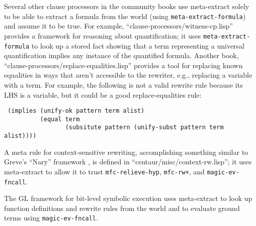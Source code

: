 Several other clause processors in the community books use
meta-extract solely to be able to extract a formula from the world
(using \texttt{meta-extract-formula}) and assume it to be true.  For
example, ``clause-processors/witness-cp.lisp'' provides a framework
for reasoning about quantification; it uses
\texttt{meta-extract-formula} to look up a stored fact showing that a
term representing a universal quantification implies any instance
of the quantified formula.  Another book,
``clause-processors/replace-equalities.lisp'' provides a tool for
replacing known equalities in ways that aren't accessible to the
rewriter, e.g., replacing a variable with a term.  For example, the
following is not a valid rewrite rule because its LHS is a variable,
but it could be a good replace-equalities rule:
\begin{verbatim}
 (implies (unify-ok pattern term alist)
          (equal term
                 (subsitute pattern (unify-subst pattern term alist))))
\end{verbatim}

A meta rule for context-sensitive rewriting, accomplishing something
similar to Greve's ``Nary'' framework \cite{greve06}, is defined in
``centaur/misc/context-rw.lisp''; it uses meta-extract to allow it to
trust \texttt{mfc-relieve-hyp}, \texttt{mfc-rw+}, and
\texttt{magic-ev-fncall}.

The GL framework for bit-level symbolic execution \cite{gl-diss,
  bit-blasting-GL} uses meta-extract to look up function definitions
and rewrite rules from the world and to evaluate ground terms using
\texttt{magic-ev-fncall}.

